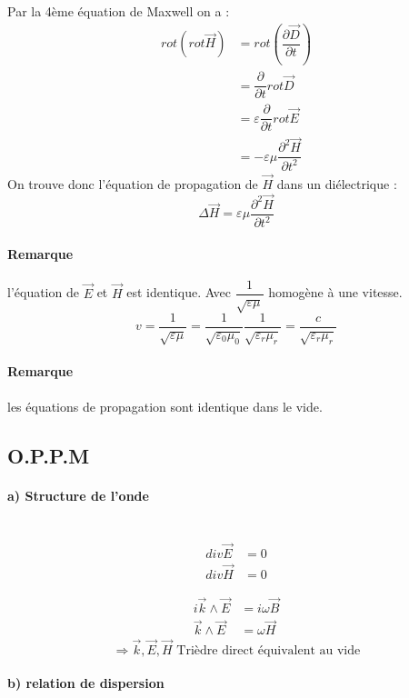 \documentclass[12pt,a4paper]{report}
\begin{document}
Par la 4ème équation de Maxwell on a :
\begin{align*}
	rot (rot \vec{H}) &= rot \left( \dfrac{\partial \vec{D}}{\partial t}\right)\\
	&= \dfrac{\partial}{\partial t} rot \vec{D}\\
	&= \varepsilon \dfrac{\partial}{\partial t} rot \vec{E}\\
	&= -\varepsilon \mu \dfrac{\partial^2 \vec{H}}{\partial t^2}
\end{align*}
On trouve donc l'équation de propagation de \(\vec{H}\) dans un diélectrique :
\[
	\Delta \vec{H} = \varepsilon \mu \dfrac{\partial^2 \vec{H}}{\partial t^2}
\]

\paragraph{Remarque} l'équation de \(\vec{E}\) et \(\vec{H}\) est identique. Avec \(\dfrac{1}{\sqrt{\varepsilon\mu}}\) homogène à une vitesse.
\[
	v = \dfrac{1}{\sqrt{\varepsilon\mu}} = \dfrac{1}{\sqrt{\varepsilon_0\mu_0}} \dfrac{1}{\sqrt{\varepsilon_r\mu_r}} = \dfrac{c}{\sqrt{\varepsilon_r\mu_r}}
\]

\paragraph{Remarque} les équations de propagation sont identique dans le vide.

\subsection{O.P.P.M}

\paragraph{a) Structure de l'onde} \quad \\
\begin{align*}
	div \vec{E} &= 0\\
	div \vec{H} &= 0
\end{align*}

\begin{align*}
	i\vec{k} \wedge \vec{E} &= i\omega \vec{B}\\
	\vec{k} \wedge \vec{E} &= \omega \vec{H}
\end{align*}
\[
	\Rightarrow \vec{k}, \vec{E}, \vec{H} \text{ Trièdre direct équivalent au vide}
\]

\paragraph{b) relation de dispersion}\quad \\
\end{document}
